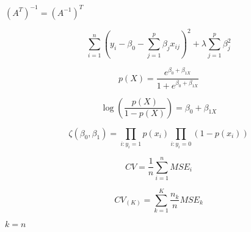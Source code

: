 \documentclass[10pt]{book}
\begin{document}
\begin{mdSnippets}
\begin{mdInlineSnippet}[7920031e189f27fa92c9e9efd1650895]%
$(A^{T})^{-1}=(A^{-1})^T$\end{mdInlineSnippet}%
\begin{mdDisplaySnippet}%
\[%
\sum_{i=1}^{n}(y_i-\beta_0-\sum_{j=1}^{p}\beta_j x_{ij})^2+\lambda \sum_{j=1}^{p}\beta_j^2
\]%
\end{mdDisplaySnippet}%
\begin{mdDisplaySnippet}[fa844e2e7d8c97568d2d0301d5147257]%
\[%
p(X)=\frac{e^{\beta_0+\beta_{1X}}}{1+e^{\beta_0+\beta_{1X}}}
\]%
\end{mdDisplaySnippet}%
\begin{mdDisplaySnippet}%
\[%
\log(\frac{p(X)}{1-p(X)}) = \beta_0+\beta_{1X}
\]%
\end{mdDisplaySnippet}%
\begin{mdDisplaySnippet}[3434640df0abf3c9138498896d5d4bb3]%
\[%
  \zeta(\beta_0,\beta_1)= \prod_{i:y_i=1}p(x_i)\prod_{i:y_i=0}(1-p(x_i))
\]%
\end{mdDisplaySnippet}%
\begin{mdDisplaySnippet}%
\[%
  CV=\frac{1}{n}\sum_{i=1}^{n}MSE_i
\]%
\end{mdDisplaySnippet}%
\begin{mdDisplaySnippet}[9ad5431ed4f79d040b8d2e68eb912e33]%
\[%
CV_{(K)}=\sum_{k=1}^{K}\frac{n_k}{n}MSE_k
\]%
\end{mdDisplaySnippet}%
\begin{mdInlineSnippet}[0a4b018f4a1382228c85c71a987d566f]%
$k=n$\end{mdInlineSnippet}%

\end{mdSnippets}
\end{document}
